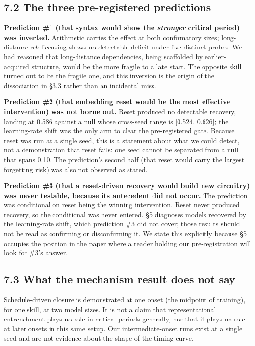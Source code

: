 \documentclass[11pt]{article}
\begin{document}
\subsection{7.2 The three pre-registered predictions}\label{the-three-pre-registered-predictions}

\textbf{Prediction \#1 (that syntax would show the \emph{stronger} critical period) was inverted.}
Arithmetic carries the effect at both confirmatory sizes; long-distance \emph{wh}-licensing shows
no detectable deficit under five distinct probes. We had reasoned that long-distance
dependencies, being scaffolded by earlier-acquired structure, would be the more fragile to a
late start. The opposite skill turned out to be the fragile one, and this inversion is the
origin of the dissociation in §3.3 rather than an incidental miss.

\textbf{Prediction \#2 (that embedding reset would be the most effective intervention) was not
borne out.} Reset produced no detectable recovery, landing at 0.586 against a null whose
cross-seed range is {[}0.524, 0.626{]}; the learning-rate shift was the only arm to clear the
pre-registered gate. Because reset was run at a single seed, this is a statement about what
we could detect, not a demonstration that reset fails: one seed cannot be separated from a
null that spans 0.10. The prediction's second half (that reset would carry the largest
forgetting risk) was also not observed as stated.

\textbf{Prediction \#3 (that a reset-driven recovery would build new circuitry) was never
testable, because its antecedent did not occur.} The prediction was conditional on reset
being the winning intervention. Reset never produced recovery, so the conditional was never
entered. §5 diagnoses models recovered by the learning-rate shift, which prediction \#3 did
not cover; those results should not be read as confirming or disconfirming it. We state this
explicitly because §5 occupies the position in the paper where a reader holding our
pre-registration will look for \#3's answer.

\subsection{7.3 What the mechanism result does not say}\label{what-the-mechanism-result-does-not-say}

Schedule-driven closure is demonstrated at one onset (the midpoint of training), for one
skill, at two model sizes. It is not a claim that representational entrenchment plays no role
in critical periods generally, nor that it plays no role at later onsets in this same setup.
Our intermediate-onset runs exist at a single seed and are not evidence about the shape of
the timing curve.
\end{document}
